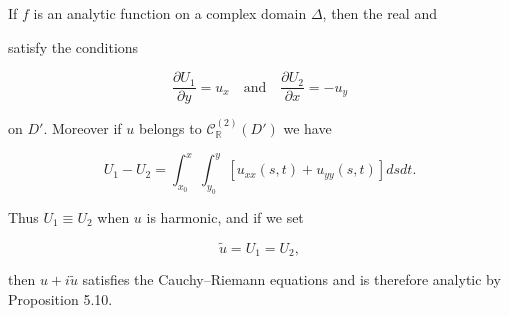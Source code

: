 If $f$ is an analytic function on a complex domain $\Delta$, then the real and

satisfy the conditions

$$\frac{\partial U_1}{\partial y} = u_x \quad \text{and} \quad \frac{\partial U_2}{\partial x} = -u_y$$

on $D'$. Moreover if $u$ belongs to $\mathcal{C}^{(2)}_{\mathbb{R}}(D')$ we have

$$U_1 - U_2 = \int_{x_0}^{x} \int_{y_0}^{y} [u_{xx}(s, t) + u_{yy}(s, t)] ds dt.$$

Thus $U_1 \equiv U_2$ when $u$ is harmonic, and if we set

$$\tilde{u} = U_1 = U_2,$$

then $u + i\tilde{u}$ satisfies the Cauchy–Riemann equations and is therefore analytic by Proposition 5.10.
